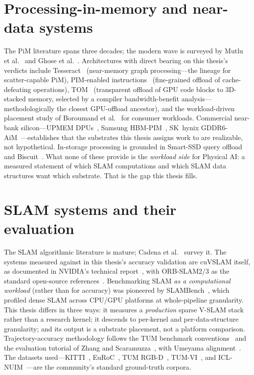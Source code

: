 \section{Processing-in-memory and near-data systems}

The PiM literature spans three decades; the modern wave is surveyed by Mutlu
et al.~\cite{mutlu2019pim} and Ghose et al.~\cite{ghose2019pim}.
Architectures with direct bearing on this thesis's verdicts include
Tesseract~\cite{ahn2015tesseract} (near-memory graph processing---the
lineage for scatter-capable PiM), PIM-enabled
instructions~\cite{ahn2015pei} (fine-grained offload of cache-defeating
operations), TOM~\cite{hsieh2016tom} (transparent offload of GPU code blocks
to 3D-stacked memory, selected by a compiler bandwidth-benefit analysis---
methodologically the closest GPU-offload ancestor), and the workload-driven
placement study of Boroumand et al.~\cite{boroumand2018google} for consumer
workloads. Commercial near-bank silicon---UPMEM
DPUs~\cite{gomezluna2021upmem}, Samsung HBM-PIM~\cite{kwon2021hbmpim},
SK~hynix GDDR6-AiM~\cite{lee2022aim}---establishes that the substrates this
thesis assigns work to are realizable, not hypothetical. In-storage
processing is grounded in Smart-SSD query offload~\cite{do2013smartssd} and
Biscuit~\cite{gu2016biscuit}. What none of these provide is the
\emph{workload side} for Physical AI: a measured statement of which SLAM
computations and which SLAM data structures want which substrate. That is
the gap this thesis fills.

\section{SLAM systems and their evaluation}

The SLAM algorithmic literature is mature; Cadena et
al.~\cite{cadena2016slam} survey it. The systems measured against in this
thesis's accuracy validation are cuVSLAM itself, as documented in NVIDIA's
technical report~\cite{cuvslam2025}, with ORB-SLAM2/3 as the standard
open-source references~\cite{murartal2017orbslam2,campos2021orbslam3}.
Benchmarking SLAM \emph{as a computational workload} (rather than for
accuracy) was pioneered by SLAMBench~\cite{nardi2015slambench}, which
profiled dense SLAM across CPU/GPU platforms at whole-pipeline granularity.
This thesis differs in three ways: it measures a \emph{production} sparse
V-SLAM stack rather than a research kernel; it descends to per-kernel and
per-data-structure granularity; and its output is a substrate placement, not
a platform comparison. Trajectory-accuracy methodology follows the TUM
benchmark conventions~\cite{sturm2012tum} and the evaluation tutorial of
Zhang and Scaramuzza~\cite{zhang2018tutorial}, with Umeyama
alignment~\cite{umeyama1991}. The datasets used---KITTI~\cite{geiger2013kitti},
EuRoC~\cite{burri2016euroc}, TUM RGB-D~\cite{sturm2012tum},
TUM-VI~\cite{schubert2018tumvi}, and ICL-NUIM~\cite{handa2014iclnuim}---are
the community's standard ground-truth corpora.

